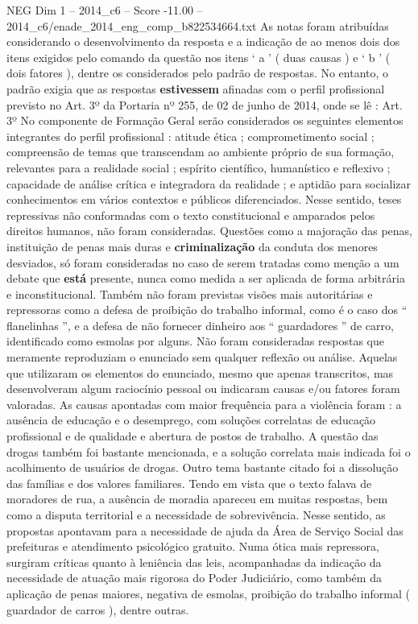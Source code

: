 \begin{textsample}{NEG Dim 1 – 2014\_c6 – Score -11.00 – 2014\_c6/enade\_2014\_eng\_comp\_b822534664.txt}
As notas foram atribuídas considerando o desenvolvimento da resposta e a indicação de ao menos dois dos itens exigidos pelo comando da questão nos itens ‘ a ’ ( duas causas ) e ‘ b ’ ( dois fatores ), dentre os considerados pelo padrão de respostas.
No entanto, o padrão exigia que as respostas \textbf{estivessem} afinadas com o perfil profissional previsto no Art. 3º da Portaria nº 255, de 02 de junho de 2014, onde se lê : Art. 3º No componente de Formação Geral serão considerados os seguintes elementos integrantes do perfil profissional : atitude ética ; comprometimento social ; compreensão de temas que transcendam ao ambiente próprio de sua formação, relevantes para a realidade social ; espírito científico, humanístico e reflexivo ; capacidade de análise crítica e integradora da realidade ; e aptidão para socializar conhecimentos em vários contextos e públicos diferenciados.
Nesse sentido, teses repressivas não conformadas com o texto constitucional e amparados pelos direitos humanos, não foram consideradas.
Questões como a majoração das penas, instituição de penas mais duras e \textbf{criminalização} da conduta dos menores desviados, só foram consideradas no caso de serem tratadas como menção a um debate que \textbf{está} presente, nunca como medida a ser aplicada de forma arbitrária e inconstitucional.
Também não foram previstas visões mais autoritárias e repressoras como a defesa de proibição do trabalho informal, como é o caso dos “ flanelinhas ”, e a defesa de não fornecer dinheiro aos “ guardadores ” de carro, identificado como esmolas por alguns.
Não foram consideradas respostas que meramente reproduziam o enunciado sem qualquer reflexão ou análise.
Aquelas que utilizaram os elementos do enunciado, mesmo que apenas transcritos, mas desenvolveram algum raciocínio pessoal ou indicaram causas e/ou fatores foram valoradas.
As causas apontadas com maior frequência para a violência foram : a ausência de educação e o desemprego, com soluções correlatas de educação profissional e de qualidade e abertura de postos de trabalho.
A questão das drogas também foi bastante mencionada, e a solução correlata mais indicada foi o acolhimento de usuários de drogas.
Outro tema bastante citado foi a dissolução das famílias e dos valores familiares.
Tendo em vista que o texto falava de moradores de rua, a ausência de moradia apareceu em muitas respostas, bem como a disputa territorial e a necessidade de sobrevivência.
Nesse sentido, as propostas apontavam para a necessidade de ajuda da Área de Serviço Social das prefeituras e atendimento psicológico gratuito.
Numa ótica mais repressora, surgiram críticas quanto à leniência das leis, acompanhadas da indicação da necessidade de atuação mais rigorosa do Poder Judiciário, como também da aplicação de penas maiores, negativa de esmolas, proibição do trabalho informal ( guardador de carros ), dentre outras.

\end{textsample}
